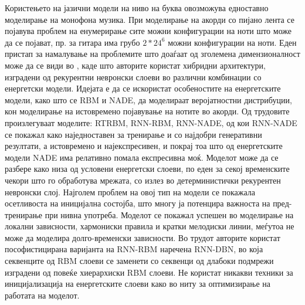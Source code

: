 Користењето на јазични модели на ниво на буква овозможува едноставно моделирање на монофона музика. При моделирање на акорди со пијано лента се појавува проблем на енумерирање сите можни конфигурации на ноти што може да се појават, пр. за гитара има грубо $2*24^6$ можни конфигурации на ноти. Еден пристап за намалување на проблемите што доаѓаат од зголемена димензионалност може да се види во \cite{Boulanger-Lewandowski2012, Boulanger-Lewandowski2014, Goel2014}, каде што авторите користат хибридни архитектури, изградени од рекурентни невронски слоеви во различни комбинации со енергетски модели. Идејата е да се искористат особеностите на енергетските модели, како што се RBM и NADE, да моделираат веројатностни дистрибуции, кон моделирање на истовремено појавување на нотите во акорди. Од трудовите \cite{Boulanger-Lewandowski2012, Boulanger-Lewandowski2014} произлегуваат моделите: RTRBM, RNN-RBM, RNN-NADE, од кои RNN-NADE се покажал како наједноставен за тренирање и со најдобри генеративни резултати, а истовремено и најекспресивен, и покрај тоа што од енергетските модели NADE има релативно помала експресивна моќ. Моделот може да се разбере како низа од условени енергетски слоеви, по еден за секој временските чекори што го обработува мрежата, со излез во детерминистички рекурентен невронски слој. Најголем проблем на овој тип на модели се покажала осетливоста на иницијална состојба, што многу ја потенцира важноста на пред-тренирање при нивна употреба. Моделот се покажал успешен во моделирање на локални зависности, хармониски правила и кратки мелодиски линии, меѓутоа не може да моделира долго-временски зависности. Во трудот \cite{Goel2014} авторите користат пософистицирана варијанта на RNN-RBM наречена RNN-DBN, во која секвенците од RBM слоеви се заменети со секвенци од длабоки подмрежи изградени од повеќе хиерархиски RBM слоеви. Не користат никакви техники за иницијализација на енергетските слоеви како во \cite{Boulanger-Lewandowski2012, Boulanger-Lewandowski2014, Goel2014} ниту за оптимизирање на работата на моделот.

